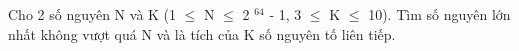 Cho 2 số nguyên N và K (1  $\le$  N  $\le$  2   $^    64   $   - 1, 3  $\le$  K  $\le$  10). Tìm số nguyên lớn nhất không vượt quá N và là tích của K số nguyên tố liên tiếp.